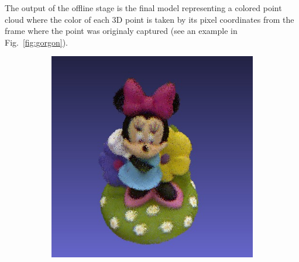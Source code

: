 \documentclass[letterpaper, 10 pt, conference]{ieeeconf}  %
\begin{document}
The output of the offline stage is the final model representing
a colored point cloud where the color of each 3D point is taken 
by its pixel coordinates from the frame where the point was originaly 
captured (see an example in Fig.~\ref{fig:gorgon}).

\begin{figure}[th]
	\centering
        \begin{subfigure}[b]{0.5\linewidth}
                \centering
                \includegraphics[width=\linewidth]{../models/mouse.jpg}
        \end{subfigure}%
        \begin{subfigure}[b]{0.5\linewidth}
                \centering

\end{subfigure}
\end{figure}
\end{document}
